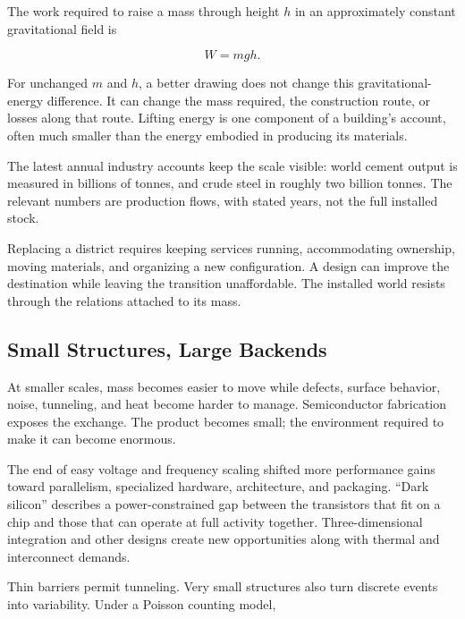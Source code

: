 The work required to raise a mass through height $h$ in an approximately constant gravitational field is

\begin{equation}
W=mgh.
\end{equation}

For unchanged $m$ and $h$, a better drawing does not change this gravitational-energy difference. It can change the mass required, the construction route, or losses along that route. Lifting energy is one component of a building's account, often much smaller than the energy embodied in producing its materials.

The latest annual industry accounts keep the scale visible: world cement output is measured in billions of tonnes, and crude steel in roughly two billion tonnes.\cite{usgs2026cement,worldsteel2026figures} The relevant numbers are production flows, with stated years, not the full installed stock.

Replacing a district requires keeping services running, accommodating ownership, moving materials, and organizing a new configuration. A design can improve the destination while leaving the transition unaffordable. The installed world resists through the relations attached to its mass.

\subsection{Small Structures, Large Backends}


At smaller scales, mass becomes easier to move while defects, surface behavior, noise, tunneling, and heat become harder to manage. Semiconductor fabrication exposes the exchange. The product becomes small; the environment required to make it can become enormous.

The end of easy voltage and frequency scaling shifted more performance gains toward parallelism, specialized hardware, architecture, and packaging. “Dark silicon” describes a power-constrained gap between the transistors that fit on a chip and those that can operate at full activity together.\cite{esmaeilzadeh2011dark} Three-dimensional integration and other designs create new opportunities along with thermal and interconnect demands.

Thin barriers permit tunneling. Very small structures also turn discrete events into variability. Under a Poisson counting model,

